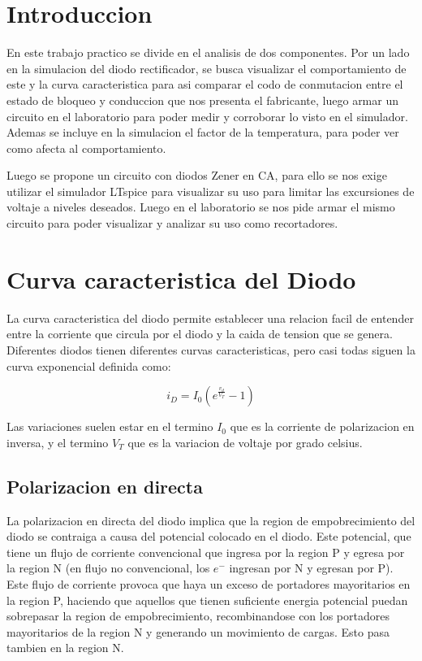 \documentclass[chaptersright]{informeutn}
\begin{document}
  \maketitle

  \tableofcontents
  \setcounter{page}{1}
  \thispagestyle{plain}

  \chapter{Introduccion}
    En este trabajo practico se divide en el analisis de dos componentes. Por un lado en la simulacion del diodo
    rectificador, se busca visualizar el comportamiento de este y la curva caracteristica para asi comparar el codo de
    conmutacion entre el estado de bloqueo y conduccion que nos presenta el fabricante, luego armar un circuito en el
    laboratorio para poder medir y corroborar lo visto en el simulador. Ademas se incluye en la simulacion el factor de
    la temperatura, para poder ver como afecta al comportamiento.

    Luego se propone un circuito con diodos Zener en CA, para ello se nos exige utilizar el simulador LTspice para
    visualizar su uso para limitar las excursiones de voltaje a niveles deseados. Luego en el laboratorio se nos pide
    armar el mismo circuito para poder visualizar y analizar su uso como recortadores.

  \chapter{Curva caracteristica del Diodo}
    La curva caracteristica del diodo permite establecer una relacion facil de entender entre la corriente que circula
    por el diodo y la caida de tension que se genera. Diferentes diodos tienen diferentes curvas caracteristicas, pero
    casi todas siguen la curva exponencial definida como:

    \begin{equation}
      i_D = I_0 \left(e^{\frac{v_d}{V_T}} - 1 \right)
    \end{equation}

    Las variaciones suelen estar en el termino $I_0$ que es la corriente de polarizacion en inversa, y el termino $V_T$
    que es la variacion de voltaje por grado celsius.

    \section{Polarizacion en directa}
      La polarizacion en directa del diodo implica que la region de empobrecimiento del diodo se contraiga a causa del
      potencial colocado en el diodo. Este potencial, que tiene un flujo de corriente convencional que ingresa por la
      region P y egresa por la region N (en flujo no convencional, los $e^-$ ingresan por N y egresan por P). Este
      flujo de corriente provoca que haya un exceso de portadores mayoritarios en la region P, haciendo que aquellos
      que tienen suficiente energia potencial puedan sobrepasar la region de empobrecimiento, recombinandose con los
      portadores mayoritarios de la region N y generando un movimiento de cargas. Esto pasa tambien en la region N.
\end{document}
